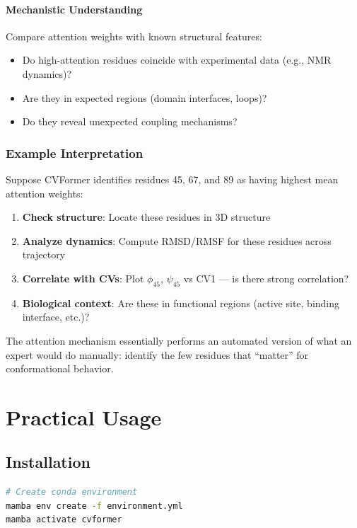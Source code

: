 \documentclass[12pt,a4paper]{article}
\begin{document}
\paragraph{Mechanistic Understanding}
Compare attention weights with known structural features:
\begin{itemize}
    \item Do high-attention residues coincide with experimental data (e.g., NMR dynamics)?
    \item Are they in expected regions (domain interfaces, loops)?
    \item Do they reveal unexpected coupling mechanisms?
\end{itemize}

\subsubsection{Example Interpretation}

Suppose CVFormer identifies residues 45, 67, and 89 as having highest mean attention weights:
\begin{enumerate}
    \item \textbf{Check structure}: Locate these residues in 3D structure
    \item \textbf{Analyze dynamics}: Compute RMSD/RMSF for these residues across trajectory
    \item \textbf{Correlate with CVs}: Plot $\phi_{45}$, $\psi_{45}$ vs CV1 — is there strong correlation?
    \item \textbf{Biological context}: Are these in functional regions (active site, binding interface, etc.)?
\end{enumerate}

The attention mechanism essentially performs an automated version of what an expert would do manually: identify the few residues that ``matter'' for conformational behavior.

\section{Practical Usage}

\subsection{Installation}

\begin{lstlisting}[language=bash]
# Create conda environment
mamba env create -f environment.yml
mamba activate cvformer
\end{lstlisting}
\end{document}
